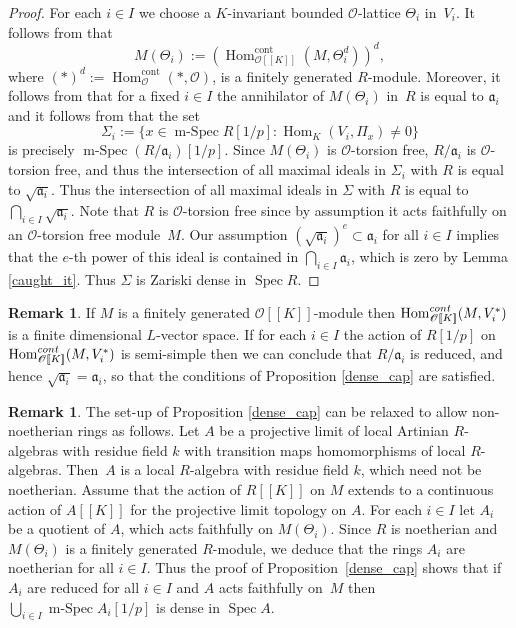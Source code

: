 \documentclass[11pt]{article}
\let\mathcal\mathscr
\theoremstyle{definition}
\newtheorem{remark}[prop]{Remark}
\DeclareMathOperator{\Hom}{Hom}
\DeclareMathOperator{\Spec}{Spec}
\DeclareMathOperator{\mSpec}{m-Spec}
\newcommand{\br}[1]{[\![#1]\!]}
\newcommand{\cO}{\mathcal{O}}
\newcommand{\cont}{\mathrm{cont}}
\begin{document}
\begin{proof} For each $i\in I$ we choose a $K$-invariant bounded $\cO$-lattice $\Theta_i$ in~$V_i$.
It follows from
\cite[Prop.\,2.15]{duke} that
\[
M(\Theta_i):=(\Hom_{\cO\br{K}}^{\cont}(M, \Theta_i^d))^d,
\]
where
$(\ast)^d:=\Hom_{\cO}^{\cont}(\ast, \cO)$, is a finitely generated $R$-module. Moreover, it follows from
\cite[Eqn.\,(11) and Rem.\,2.18]{duke} that for a fixed $i\in I$ the annihilator of $M(\Theta_i)$ in~$R$ is equal to $\mathfrak a_i$ and it follows from \cite[Prop.\,2.22]{duke} that the set
\[
\Sigma_i:=\{ x\in \mSpec R[1/p]: \Hom_K(V_i, \Pi_x)\neq 0\}
\]
is precisely $\mSpec (R/\mathfrak a_i)[1/p]$. Since $M(\Theta_i)$ is $\cO$-torsion free, $R/\mathfrak a_i$ is $\cO$-torsion free, and thus the intersection of all maximal ideals in $\Sigma_i$ with $R$ is equal to $\sqrt{\mathfrak a_i}$. Thus the intersection of all maximal ideals in $\Sigma$ with $R$ is equal to $\bigcap_{i\in I} \sqrt{\mathfrak a_i}$.
Note that $R$ is $\cO$-torsion free since by assumption it acts faithfully on an $\cO$-torsion free module~$M$.
Our assumption $(\sqrt{\mathfrak a_i})^e \subset \mathfrak a_i$ for all $i\in I$
implies that the $e$-th power of this ideal is contained in $\bigcap_{i\in I} \mathfrak a_i$, which is zero by Lemma \ref{caught_it}. Thus $\Sigma$ is Zariski dense in $\Spec R$.
\end{proof}

\begin{remark}\label{rem:semi-simple}
If $M$ is a finitely generated $\cO\br{K}$-module then $\Hom_{\cO\br{K}}^{\rm cont}(M, V_i^*)$ is a finite dimensional $L$-vector space.
If for each $i\in I$ the action of $R[1/p]$ on $\Hom_{\cO\br{K}}^{\rm cont}(M, V_i^*)$ is semi-simple then we can conclude that $R/\mathfrak a_i$ is reduced, and
hence $\sqrt{\mathfrak a_i}=\mathfrak a_i$, so that the conditions of Proposition \ref{dense_cap} are satisfied.
\end{remark}

\begin{remark}\label{nonnoetherian} The set-up of Proposition \ref{dense_cap} can be relaxed to allow non-noetherian rings as follows.
Let $A$ be a projective limit of local Artinian $R$-algebras with residue field $k$ with transition maps homomorphisms of local $R$-algebras. Then~$A$ is a local
$R$-algebra with residue field $k$, which need not be noetherian. Assume that the action of $R\br{K}$ on
$M$ extends to a continuous action of $A\br{K}$ for the projective limit topology on $A$. For each $i\in I$ let $A_i$ be a quotient of $A$, which acts faithfully on $M(\Theta_i)$.
Since $R$ is noetherian and $M(\Theta_i)$ is a finitely generated $R$-module, we deduce that the rings $A_i$ are noetherian for all $i\in I$.
Thus the proof of \hbox{Proposition}~\ref{dense_cap} shows that if $A_i$ are reduced for all $i\in I$ and $A$ acts faithfully on~$M$ then $\bigcup_{i\in I} \mSpec A_i [1/p]$
is dense in $\Spec A$.
\end{remark}
\end{document}
